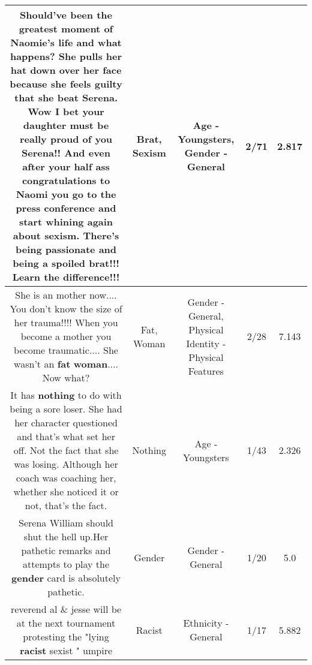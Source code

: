 \documentclass[11pt]{article}
\newlength\mylength
\begin{document}
\begin{center}
\begin{longtable}{|C{.65\mylength}|C{.30\mylength}|C{.12\mylength}|C{.12\mylength}|C{.12\mylength}|}
  \small Should've been the greatest moment of Naomie's life and what happens? She pulls her hat down over her face because she feels guilty that she beat Serena. Wow I bet your daughter must be really proud of you Serena!! And even after your half ass congratulations to Naomi you go to the press conference and start whining again about \textbf{sexism}. There's being passionate and being a spoiled \textbf{brat}!!! Learn the difference!!!\normalsize   & Brat, Sexism & Age - Youngsters, Gender - General & 2/71 & 2.817 \\  \hline
  \small She is an mother now.... You don't know the size of her trauma!!!! When you become a mother you become traumatic.... She wasn't an \textbf{fat} \textbf{woman}.... Now what?\normalsize   & Fat, Woman & Gender - General, Physical Identity - Physical Features & 2/28 & 7.143 \\  \hline
  \small It has \textbf{nothing} to do with being a sore loser. She had her character questioned and that's what set her off. Not the fact that she was losing. Although her coach was coaching her, whether she noticed it or not, that's the fact.\normalsize   & Nothing & Age - Youngsters & 1/43 & 2.326 \\  \hline
  \small Serena William should shut the hell up.Her pathetic remarks and attempts to play the \textbf{gender} card is absolutely pathetic.\normalsize   & Gender & Gender - General & 1/20 & 5.0 \\  \hline
  \small reverend al \& jesse will be at the next tournament protesting the "lying \textbf{racist} sexist " umpire\normalsize   & Racist & Ethnicity - General & 1/17 & 5.882 \\  \hline

\end{longtable}
\end{center}
\end{document}
